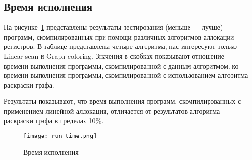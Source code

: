 \subsection{Время исполнения}

На рисунке~\ref{fig:run_time} представлены результаты тестирования (меньше --- лучше) программ,
скомпилированных при помощи различных алгоритмов аллокации регистров.
В таблице представлены четыре алгоритма, нас интересуют только Linear scan и Graph coloring.
Значения в скобках показывают отношение времени выполнения программы,
скомпилированной с данным алгоритмом, ко времени выполнения программы,
скомпилированной с использованием алгоритма раскраски графа.

Результаты показывают, что время выполнения программ,
скомпилированных с применением линейной аллокации,
отличается от результатов алгоритма раскраски графа в пределах 10\%.

\begin{figure}[h]
	\texttt{[image: run\_time.png]}
	\caption{Время исполнения}
	\label{fig:run_time}
\end{figure}


